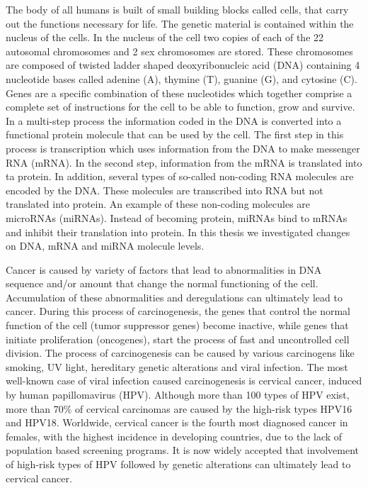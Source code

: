 
\begin{summary}

The body of all humans is built of small building blocks called cells, that carry out the functions necessary for life. The genetic material is contained within the nucleus of the cells. In the nucleus of the cell two copies of each of the 22 autosomal chromosomes and 2 sex chromosomes are stored. These chromosomes are composed of twisted ladder shaped deoxyribonucleic acid (DNA) containing 4 nucleotide bases called adenine (A), thymine (T), guanine (G), and cytosine (C). Genes are a specific combination of these nucleotides which together comprise a complete set of instructions for the cell to be able to function, grow and survive. 
In a multi-step process the information coded in the DNA is converted into a functional protein molecule that can be used by the cell. The first step in this process is transcription which uses information from the DNA to make messenger RNA (mRNA). In the second step, information from the mRNA is translated into ta protein. In addition, several types of so-called non-coding RNA molecules are encoded by the DNA. These molecules are transcribed into RNA but not translated into protein. An example of these non-coding molecules are microRNAs (miRNAs). Instead of becoming protein, miRNAs bind to mRNAs and inhibit their translation into protein. In this thesis we investigated changes on DNA, mRNA and miRNA molecule levels. 

Cancer is caused by variety of factors that lead to abnormalities in DNA sequence and/or amount that change the normal functioning of the cell. Accumulation of these abnormalities and deregulations can ultimately lead to cancer. During this process of carcinogenesis, the genes that control the normal function of the cell (tumor suppressor genes) become inactive, while genes that initiate proliferation (oncogenes), start the process of fast and uncontrolled cell division. The process of carcinogenesis can be caused by various carcinogens like smoking, UV light, hereditary genetic alterations and viral infection. The most well-known case of viral infection caused carcinogenesis is cervical cancer, induced by human papillomavirus (HPV). Although more than 100 types of HPV exist, more than 70$\%$ of cervical carcinomas are caused by the high-risk types HPV16 and HPV18. Worldwide, cervical cancer is the fourth most diagnosed cancer in females, with the highest incidence in developing countries, due to the lack of population based screening programs. It is now widely accepted that involvement of high-risk types of HPV followed by genetic alterations can ultimately lead to cervical cancer.


\end{summary}
